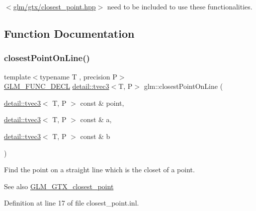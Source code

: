 $<$\hyperlink{closest__point_8hpp}{glm/gtx/closest\+\_\+point.\+hpp}$>$ need to be included to use these functionalities. 

\subsection{Function Documentation}
\mbox{\label{group__gtx__closest__point_ga03a6d7e93590f5d45050f6dc7aa8bf8f}} 
\subsubsection{\texorpdfstring{closest\+Point\+On\+Line()}{closestPointOnLine()}}
{\footnotesize\ttfamily template$<$typename T , precision P$>$ \\
\hyperlink{setup_8hpp_ab2d052de21a70539923e9bcbf6e83a51}{G\+L\+M\+\_\+\+F\+U\+N\+C\+\_\+\+D\+E\+CL} \hyperlink{structglm_1_1detail_1_1tvec3}{detail\+::tvec3}$<$T, P$>$ glm\+::closest\+Point\+On\+Line (\begin{DoxyParamCaption}\item[{\hyperlink{structglm_1_1detail_1_1tvec3}{detail\+::tvec3}$<$ T, P $>$ const \&}]{point,  }\item[{\hyperlink{structglm_1_1detail_1_1tvec3}{detail\+::tvec3}$<$ T, P $>$ const \&}]{a,  }\item[{\hyperlink{structglm_1_1detail_1_1tvec3}{detail\+::tvec3}$<$ T, P $>$ const \&}]{b }\end{DoxyParamCaption})}

Find the point on a straight line which is the closet of a point. \begin{DoxySeeAlso}{See also}
\hyperlink{group__gtx__closest__point}{G\+L\+M\+\_\+\+G\+T\+X\+\_\+closest\+\_\+point} 
\end{DoxySeeAlso}


Definition at line 17 of file closest\+\_\+point.\+inl.

